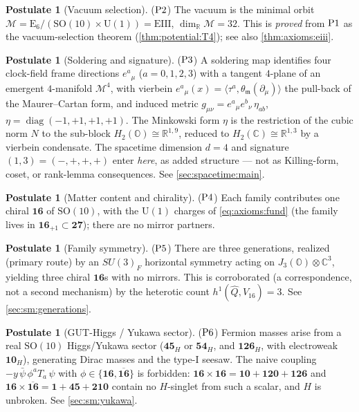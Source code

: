 \documentclass[11pt]{article}
\theoremstyle{plain}
\theoremstyle{definition}
\newtheorem{postulate}[theorem]{Postulate}
\theoremstyle{remark}
\newcommand{\SO}[1]{\mathrm{SO}(#1)}
\newcommand{\U}[1]{\mathrm{U}(#1)}
\newcommand{\E}[1]{\mathrm{E}_{#1}}
\newcommand{\diag}{\operatorname{diag}}
\newcommand{\Oct}{\mathbb{O}}
\newcommand{\M}{\mathcal{M}}
\newcommand{\jalg}{J_3(\mathbb{O})}
\newcommand{\SOTen}{\SO{10}}
\newcommand{\UOne}{\U{1}}
\newcommand{\ESix}{\E{6}}
\newcommand{\Rep}[1]{\mathbf{#1}}
\newcommand{\Repbar}[1]{\overline{\mathbf{#1}}}
\newcommand{\Pone}{\textnormal{P1}}
\newcommand{\Ptwo}{\textnormal{P2}}
\newcommand{\Pthree}{\textnormal{P3}}
\newcommand{\Pfour}{\textnormal{P4}}
\newcommand{\Pfive}{\textnormal{P5}}
\newcommand{\Psix}{\textnormal{P6}}
\begin{document}
\begin{postulate}[Vacuum selection]\label{post:axioms:P2}
($\Ptwo$) The vacuum is the minimal orbit
$\M=\ESix/(\SOTen\times\UOne)=\mathrm{EIII}$, $\dim_{\mathbb R}\M=32$. This is
\emph{proved} from $\Pone$ as the vacuum-selection theorem
(\autoref{thm:potential:T4}); see also \autoref{thm:axioms:eiii}.
\end{postulate}

\begin{postulate}[Soldering and signature]\label{post:axioms:P3}
($\Pthree$) A soldering map identifies four clock-field frame directions
$e^{a}{}_{\mu}$ ($a=0,1,2,3$) with a tangent $4$-plane of an emergent
$4$-manifold $\mathcal M^4$, with vierbein
$e^{a}{}_{\mu}(x)=\langle\tau^a,\theta_{\mathfrak m}(\partial_\mu)\rangle$
the pull-back of the Maurer--Cartan form, and induced metric
$g_{\mu\nu}=e^{a}{}_{\mu}e^{b}{}_{\nu}\,\eta_{ab}$,
$\eta=\diag(-1,+1,+1,+1)$. The Minkowski form $\eta$ is the restriction of
the cubic norm $N$ to the sub-block $H_2(\Oct)\cong\mathbb R^{1,9}$, reduced
to $H_2(\mathbb C)\cong\mathbb R^{1,3}$ by a vierbein condensate. The
spacetime dimension $d=4$ and signature $(1,3)=(-,+,+,+)$ enter \emph{here},
as added structure --- not as Killing-form, coset, or rank-lemma
consequences. See \autoref{sec:spacetime:main}.
\end{postulate}

\begin{postulate}[Matter content and chirality]\label{post:axioms:P4}
($\Pfour$) Each family contributes one chiral $\Rep{16}$ of $\SOTen$, with
the $\UOne$ charges of \eqref{eq:axioms:fund} (the family lives in
$\Rep{16}_{+1}\subset\Rep{27}$); there are no mirror partners.
\end{postulate}

\begin{postulate}[Family symmetry]\label{post:axioms:P5}
($\Pfive$) There are three generations, realized (primary route) by an
$SU(3)_F$ horizontal symmetry acting on $\jalg\otimes\mathbb C^3$,
yielding three chiral $\Rep{16}$s with no mirrors. This is corroborated
(a correspondence, not a second mechanism) by the heterotic count
$h^1(\widehat Q,V_{16})=3$. See \autoref{sec:sm:generations}.
\end{postulate}

\begin{postulate}[GUT-Higgs / Yukawa sector]\label{post:axioms:P6}
($\Psix$) Fermion masses arise from a real $\SOTen$ Higgs/Yukawa sector
($\Rep{45}_H$ or $\Rep{54}_H$, and $\Rep{126}_H$, with electroweak
$\Rep{10}_H$), generating Dirac masses and the type-I seesaw. The naive
coupling $-y\,\bar\psi\,\phi^a T_a\,\psi$ with $\phi\in\{\Rep{16},\Repbar{16}\}$
is forbidden: $\Rep{16}\times\Rep{16}=\Rep{10}+\Rep{120}+\Rep{126}$ and
$\Rep{16}\times\Repbar{16}=\Rep{1}+\Rep{45}+\Rep{210}$ contain no $H$-singlet
from such a scalar, and $H$ is unbroken. See \autoref{sec:sm:yukawa}.
\end{postulate}
\end{document}
